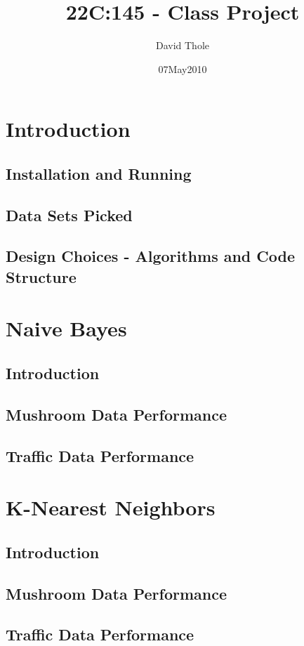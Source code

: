 \documentclass{article}
\begin{document}
\title{22C:145 - Class Project}
\author{David Thole}
\date{07May2010}

\thispagestyle{plain}           %
\tableofcontents
{} %
\cleardoublepage                %

\section{Introduction}
\subsection{Installation and Running}
\subsection{Data Sets Picked}
\subsection{Design Choices - Algorithms and Code Structure}

\section{Naive Bayes}
\subsection{Introduction}
\subsection{Mushroom Data Performance}
\subsection{Traffic Data Performance}
\section{K-Nearest Neighbors}
\subsection{Introduction}
\subsection{Mushroom Data Performance}
\subsection{Traffic Data Performance}
\end{document}
